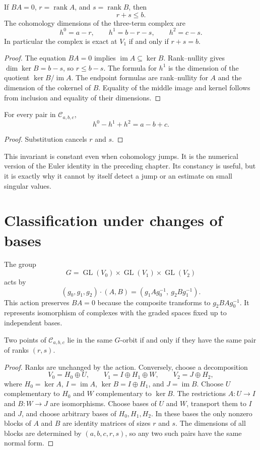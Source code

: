 \begin{proposition}
If $BA=0$, $r=\operatorname{rank}A$, and $s=\operatorname{rank}B$, then
\[
r+s\leq b.
\]
The cohomology dimensions of the three-term complex are
\[
h^0=a-r,\qquad h^1=b-r-s,\qquad h^2=c-s.
\]
In particular the complex is exact at $V_1$ if and only if $r+s=b$.
\end{proposition}
\begin{proof}
The equation $BA=0$ implies $\operatorname{im}A\subseteq\ker B$. Rank--nullity gives $\dim\ker B=b-s$, so $r\leq b-s$. The formula for $h^1$ is the dimension of the quotient $\ker B/\operatorname{im}A$. The endpoint formulas are rank--nullity for $A$ and the dimension of the cokernel of $B$. Equality of the middle image and kernel follows from inclusion and equality of their dimensions.
\end{proof}

\begin{corollary}
For every pair in $\mathcal C_{a,b,c}$,
\[
h^0-h^1+h^2=a-b+c.
\]
\end{corollary}
\begin{proof}
Substitution cancels $r$ and $s$.
\end{proof}

This invariant is constant even when cohomology jumps. It is the numerical version of the Euler identity in the preceding chapter. Its constancy is useful, but it is exactly why it cannot by itself detect a jump or an estimate on small singular values.

\section{Classification under changes of bases}

The group
\[
G=\operatorname{GL}(V_0)\times\operatorname{GL}(V_1)
   \times\operatorname{GL}(V_2)
\]
acts by
\[
(g_0,g_1,g_2)\cdot(A,B)
=(g_1Ag_0^{-1},\ g_2Bg_1^{-1}).
\]
This action preserves $BA=0$ because the composite transforms to $g_2BAg_0^{-1}$. It represents isomorphism of complexes with the graded spaces fixed up to independent bases.

\begin{theorem}
Two points of $\mathcal C_{a,b,c}$ lie in the same $G$-orbit if and only if they have the same pair of ranks $(r,s)$.
\end{theorem}
\begin{proof}
Ranks are unchanged by the action. Conversely, choose a decomposition
\[
V_0=H_0\oplus U,\qquad
V_1=I\oplus H_1\oplus W,\qquad
V_2=J\oplus H_2,
\]
where $H_0=\ker A$, $I=\operatorname{im}A$, $\ker B=I\oplus H_1$, and $J=\operatorname{im}B$. Choose $U$ complementary to $H_0$ and $W$ complementary to $\ker B$. The restrictions $A:U\to I$ and $B:W\to J$ are isomorphisms. Choose bases of $U$ and $W$, transport them to $I$ and $J$, and choose arbitrary bases of $H_0,H_1,H_2$. In these bases the only nonzero blocks of $A$ and $B$ are identity matrices of sizes $r$ and $s$. The dimensions of all blocks are determined by $(a,b,c,r,s)$, so any two such pairs have the same normal form.
\end{proof}


